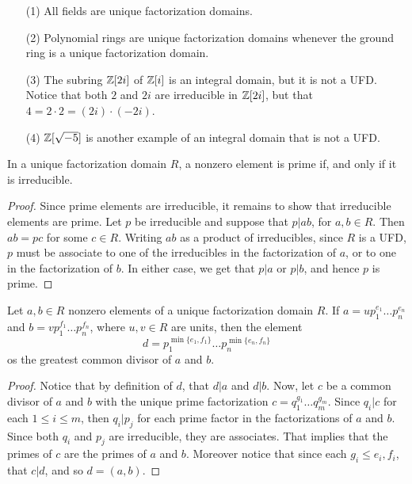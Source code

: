 \begin{example}\label{example_6.8}
  \begin{enumerate}
    \item[(1)] All fields are unique factorization domains.

    \item[(2)] Polynomial rings are unique factorization domains whenever
      the ground ring is a unique factorization domain.

    \item[(3)] The subring $\mathbb{Z}[2i]$ of $\mathbb{Z}[i]$ is an integral domain, but it
      is not a UFD. Notice that both $2$ and  $2i$ are irreducible in
      $\mathbb{Z}[2i]$, but that $4=2 \cdot 2=(2i) \cdot (-2i)$.

    \item[(4)] $\mathbb{Z}[\sqrt{-5}]$ is another example of an integral domain that
      is not a UFD.
  \end{enumerate}
\end{example}

\begin{lemma}\label{lemma_6.3.3}
  In a unique factorization domain $R$, a nonzero element is prime if, and
  only if it is irreducible.
\end{lemma}
\begin{proof}
  Since prime elements are irreducible, it remains to show that irreducible
  elements are prime. Let $p$ be irreducible and suppose that  $p|ab$, for
  $a,b \in R$. Then  $ab=pc$ for some  $c \in R$. Writing  $ab$ as a product
  of irreducibles, since  $R$ is a UFD,  $p$ must be associate to one of the
  irreducibles in the factorization of $a$, or to one in the factorization of
  $b$. In either case, we get that $p|a$ or $p|b$, and hence  $p$ is prime.
\end{proof}

\begin{lemma}\label{lemma_6.3.4}
  Let $a,b \in R$ nonzero elements of a unique factorization domain $R$. If
  $a=up_1^{e_1} \dots p_n^{e_n}$ and $b=vp_1^{f_1} \dots p_n^{f_n}$, where
  $u,v \in R$ are units, then the element
  \begin{equation*}
    d=p_1^{\min\{e_1,f_1\}} \dots p_n^{\min\{e_n,f_n\}}
  \end{equation*}
  os the greatest common divisor of $a$ and  $b$.
\end{lemma}
\begin{proof}
  Notice that by definition of $d$, that  $d|a$ and  $d|b$. Now, let  $c$ be a
  common divisor of  $a$ and  $b$ with the unique prime factorization
  $c=q_1^{g_1} \dots q_m^{g_m}$. Since $q_i|c$ for each  $1 \leq i \leq m$,
  then  $q_i|p_j$ for each prime factor in the factorizations of  $a$ and
  $b$. Since both  $q_i$ and  $p_j$ are irreducible, they are associates. That
  implies that the primes of  $c$ are the primes of  $a$ and  $b$. Moreover
  notice that since each $g_i \leq e_i,f_i$, that  $c|d$, and so  $d=(a,b)$.
\end{proof}

